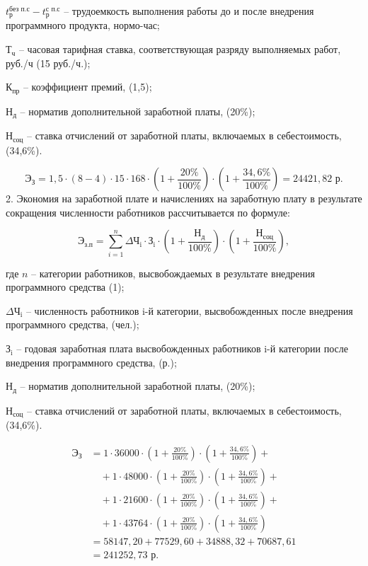 $t^{\text{без п.с}}_{\text{р}}-t^{\text{с п.с}}_{\text{р}}$ -- трудоемкость выполнения работы до и после внедрения программного продукта, нормо-час;

$\text{Т}_{\text{ч}}$ -- часовая тарифная ставка, соответствующая разряду выполняемых работ, руб./ч (15 руб./ч.);

$\text{К}_{\text{пр}}$ -- коэффициент премий, (1,5);

$\text{Н}_{\text{д}}$ -- норматив дополнительной заработной платы, (20\%);

$\text{Н}_{\text{соц}}$ -- ставка отчислений от заработной платы, включаемых в себестоимость, (34,6\%).

$$
	\text{Э}_{\text{З}} = 1,5 \cdot (8-4)\cdot 15\cdot 168 \cdot  (1+\frac{20\%}{100\%})\cdot (1+\frac{34,6\%}{100\%}) =  24421,82 \text{ р}.
$$
2. Экономия на заработной плате и начислениях на заработную плату в результате сокращения численности работников рассчитывается по формуле:

\begin{equation}
	\text{Э}_{\text{з.п}} = \sum_{i=1}^{n}{\text{$\Delta$Ч}_{\text{i}}\cdot \text{З}_{\text{i}}\cdot  (1+\frac{\text{Н}_{\text{д}}}{100\%})\cdot (1+\frac{\text{Н}_{\text{соц}}}{100\%})},
\end{equation}

где $n$ -- категории работников, высвобождаемых в результате внедрения
программного средства (1);

$\text{$\Delta$Ч}_{\text{i}}$ -- численность работников i-й категории, высвобожденных после
внедрения программного средства, (чел.);

$\text{З}_{\text{i}}$ -- годовая заработная плата высвобожденных работников i-й категории после внедрения программного средства, (р.);

$\text{Н}_{\text{д}}$ -- норматив дополнительной заработной платы, (20\%);

$\text{Н}_{\text{соц}}$ -- ставка отчислений от заработной платы, включаемых в себестоимость, (34,6\%).

\begin{align*}
	\text{Э}_{\text{З}} & = 1 \cdot 36000 \cdot \left(1 + \frac{20\%}{100\%}\right) \cdot \left(1 + \frac{34,6\%}{100\%}\right) +       \\
	                    & \quad + 1 \cdot 48000 \cdot \left(1 + \frac{20\%}{100\%}\right) \cdot \left(1 + \frac{34,6\%}{100\%}\right) + \\
	                    & \quad + 1 \cdot 21600 \cdot \left(1 + \frac{20\%}{100\%}\right) \cdot \left(1 + \frac{34,6\%}{100\%}\right) + \\
	                    & \quad + 1 \cdot 43764 \cdot \left(1 + \frac{20\%}{100\%}\right) \cdot \left(1 + \frac{34,6\%}{100\%}\right)   \\
	                    & = 58147,20 + 77529,60 + 34888,32 + 70687,61                                                                   \\
	                    & = 241252,73 \text{ р}.
\end{align*}

